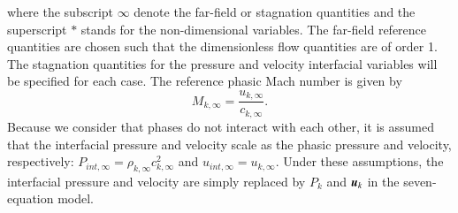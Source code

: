\documentclass[preprint,10pt]{elsarticle}
\begin{document}
%
where  the subscript $\infty$ denote the far-field or stagnation quantities and the superscript $*$ stands for the non-dimensional variables. The far-field reference quantities are chosen such that the dimensionless flow quantities are of order 1. The stagnation quantities for the pressure and velocity interfacial variables will be specified for each case. The reference phasic Mach number is given by
%
\begin{equation}
M_{k,\infty} = \frac{u_{k,\infty}}{c_{k,\infty}}.
\end{equation}
%
Because we consider that phases do not interact with each other, it is assumed that the interfacial pressure and velocity scale as the phasic pressure and velocity, respectively: $P_{int,\infty} = \rho_{k,\infty} c^2_{k,\infty}$ and $u_{int,\infty} = u_{k,\infty}$. Under these assumptions, the interfacial pressure and velocity are simply replaced by $P_k$ and $\boldsymbol u_k$ in the seven-equation model. %
% 
\end{document}
